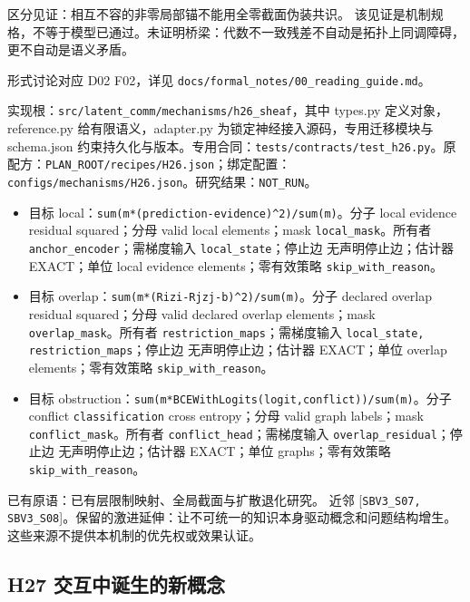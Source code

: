 \documentclass[
  10pt,
]{article}
\begin{document}
区分见证：相互不容的非零局部锚不能用全零截面伪装共识。
该见证是机制规格，不等于模型已通过。未证明桥梁：代数不一致残差不自动是拓扑上同调障碍，更不自动是语义矛盾。

形式讨论对应 D02 F02，详见
{\small\nolinkurl{docs/formal_notes/00_reading_guide.md}}。

实现根：{\small\nolinkurl{src/latent_comm/mechanisms/h26_sheaf}}，其中
types.py 定义对象，reference.py 给有限语义，adapter.py
为锁定神经接入源码，专用迁移模块与 schema.json
约束持久化与版本。专用合同：{\small\nolinkurl{tests/contracts/test_h26.py}}。原配方：{\small\nolinkurl{PLAN_ROOT/recipes/H26.json}}；绑定配置：{\small\nolinkurl{configs/mechanisms/H26.json}}。研究结果：\nolinkurl{NOT_RUN}。

\begin{itemize}
\item
  目标
  local：{\small\nolinkurl{sum(m*(prediction-evidence)^2)/sum(m)}}。分子
  local evidence residual squared；分母 valid local elements；mask
  \nolinkurl{local_mask}。所有者 \nolinkurl{anchor_encoder}；需梯度输入
  \nolinkurl{local_state}；停止边 无声明停止边；估计器 EXACT；单位 local
  evidence elements；零有效策略 \nolinkurl{skip_with_reason}。
\item
  目标
  overlap：{\small\nolinkurl{sum(m*(Ri}\hspace{0.333em}\nolinkurl{zi-Rj}\hspace{0.333em}\nolinkurl{zj-b)^2)/sum(m)}}。分子
  declared overlap residual squared；分母 valid declared overlap
  elements；mask \nolinkurl{overlap_mask}。所有者
  \nolinkurl{restriction_maps}；需梯度输入 \nolinkurl{local_state,}
  \nolinkurl{restriction_maps}；停止边 无声明停止边；估计器 EXACT；单位
  overlap elements；零有效策略 \nolinkurl{skip_with_reason}。
\item
  目标
  obstruction：{\small\nolinkurl{sum(m*BCEWithLogits(logit,conflict))/sum(m)}}。分子
  conflict \nolinkurl{classification} cross entropy；分母 valid graph
  labels；mask \nolinkurl{conflict_mask}。所有者
  \nolinkurl{conflict_head}；需梯度输入
  \nolinkurl{overlap_residual}；停止边 无声明停止边；估计器 EXACT；单位
  graphs；零有效策略 \nolinkurl{skip_with_reason}。
\end{itemize}

已有原语：已有层限制映射、全局截面与扩散退化研究。 近邻
{[}\nolinkurl{SBV3_S07,}
\nolinkurl{SBV3_S08}{]}。保留的激进延伸：让不可统一的知识本身驱动概念和问题结构增生。
这些来源不提供本机制的优先权或效果认证。

\subsection{H27
交互中诞生的新概念}\label{h27-ux4ea4ux4e92ux4e2dux8bdeux751fux7684ux65b0ux6982ux5ff5}
\end{document}
